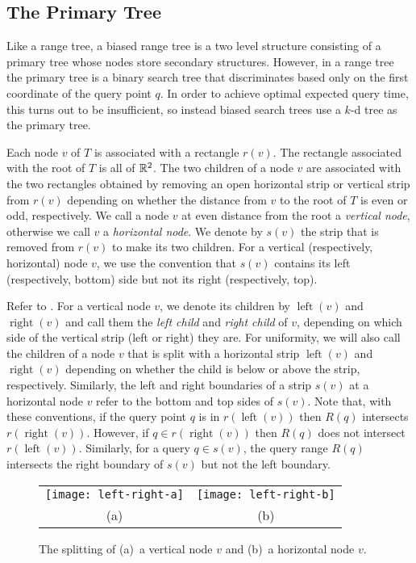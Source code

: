 \documentclass[lotsofwhite,charterfonts]{patmorin}
\DeclareMathOperator{\lft}{left}
\DeclareMathOperator{\rght}{right}
\begin{document}
\subsection{The Primary Tree}

Like a range tree, a biased range tree is a two level structure
consisting of a primary tree whose nodes store secondary structures.
However, in a range tree the primary tree is a binary search tree that
discriminates based only on the first coordinate of the query point
$q$.  In order to achieve optimal expected query time, this turns out
to be insufficient, so instead biased search trees use a $k$-d tree
\cite{X} as the primary tree.

Each node $v$ of $T$ is associated with a rectangle $r(v)$.  The
rectangle associated with the root of $T$ is all of $\mathbb{R}^2$. The two
children of a node $v$ are associated with the two rectangles obtained
by removing an open horizontal strip or vertical strip from
$r(v)$ depending on whether the distance from $v$ to the root of $T$
is even or odd, respectively.  We call a node $v$ at even distance
from the root a \emph{vertical node}, otherwise we call $v$ a
\emph{horizontal node}.  We denote by $s(v)$ the strip that is removed
from $r(v)$ to make its two children.  For a vertical (respectively,
horizontal) node $v$, we use the convention that
$s(v)$ contains its left (respectively, bottom) side but not its
right (respectively, top).

Refer to .
For a vertical node $v$, we denote its children by $\lft(v)$ and
$\rght(v)$ and call them the \emph{left child} and \emph{right child}
of $v$, depending on which side of the vertical strip (left or right)
they are.  For uniformity, we will also call the children of a node
$v$ that is split with a horizontal strip $\lft(v)$ and $\rght(v)$
depending on whether the child is below or above the strip,
respectively.  Similarly, the left and right boundaries of a strip
$s(v)$ at a horizontal node $v$ refer to the bottom and top sides of
$s(v)$.  Note that, with these conventions, if the query point $q$ is
in $r(\lft(v))$ then $R(q)$ intersects $r(\rght(v))$.  However, if
$q\in r(\rght(v))$ then $R(q)$ does not intersect $r(\lft(v))$.
Similarly, for a query $q\in s(v)$, the query range $R(q)$ intersects
the right boundary of $s(v)$ but not the left boundary.

\begin{figure}
  \begin{center}
    \begin{tabular}{cc}
      \texttt{[image: left-right-a]} & \texttt{[image: left-right-b]} \\
      (a) & (b)
    \end{tabular}
  \end{center}
  \caption{The splitting of (a)~a vertical node $v$ and (b)~a horizontal
  node $v$.}
\end{figure}
\end{document}
